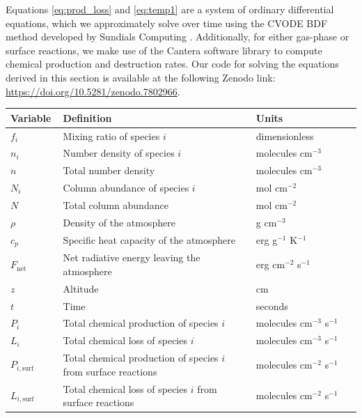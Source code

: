 Equations \eqref{eq:prod_loss} and \eqref{eq:temp1} are a system of ordinary differential equations, which we approximately solve over time using the CVODE BDF method developed by Sundials Computing \citep{Hindmarsh_2005}. Additionally, for either gas-phase or surface reactions, we make use of the Cantera software library \citep{Goodwin_2022} to compute chemical production and destruction rates. Our code for solving the equations derived in this section is available at the following Zenodo link: \url{https://doi.org/10.5281/zenodo.7802966}.

\begin{spacing}{1.0}
\begin{center}
  \begin{tabularx}{\linewidth}{p{0.15\linewidth} | p{0.55\linewidth} | p{0.3\linewidth}} \caption{Variables} \label{tab:5impacts_variables} \\
  \hline \hline
  Variable & Definition & Units \\
  \hline
  $f_{i}$ & Mixing ratio of species $i$ & dimensionless 
  \\
  $n_{i}$ & Number density of species $i$ & molecules cm$^{-3}$ 
  \\
  $n$ & Total number density & molecules cm$^{-3}$ 
  \\
  $N_{i}$ & Column abundance of species $i$ & mol cm$^{-2}$ 
  \\
  $N$ & Total column abundance & mol cm$^{-2}$ 
  \\
  $\rho$ & Density of the atmosphere & g cm$^{-3}$ 
  \\
  $c_p$ & Specific heat capacity of the atmosphere & erg g$^{-1}$ K$^{-1}$
  \\
  $F_\text{net}$ & Net radiative energy leaving the atmosphere & erg cm$^{-2}$ s$^{-1}$
  \\
  $z$ & Altitude & cm 
  \\
  $t$ & Time & seconds 
  \\
  $P_{i}$ & Total chemical production of species $i$ & molecules cm$^{-3}$ s$^{-1}$ 
  \\
  $L_{i}$ & Total chemical loss of species $i$ & molecules cm$^{-3}$ s$^{-1}$ 
  \\
  $P_{i,\text{surf}}$ & Total chemical production of species $i$ from surface reactions & molecules
  cm$^{-2}$ s$^{-1}$ 
  \\
  $L_{i,\text{surf}}$ & Total chemical loss of species $i$ from surface reactions & molecules
  cm$^{-2}$ s$^{-1}$ 
  \\

\end{tabularx}
\end{center}
\end{spacing}
